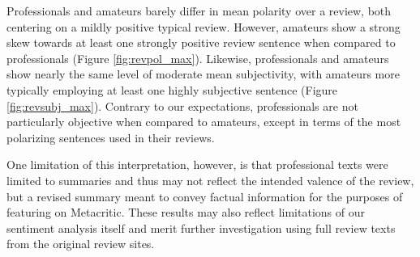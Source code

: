 \documentclass[letterpaper]{article}
\begin{document}
Professionals and amateurs barely differ in mean polarity over a review, both centering on a mildly positive typical review. However, amateurs show a strong skew towards at least one strongly positive review sentence when compared to professionals (Figure \ref{fig:revpol_max}). Likewise, professionals and amateurs show nearly the same level of moderate mean subjectivity, with amateurs more typically employing at least one highly subjective sentence (Figure \ref{fig:revsubj_max}). Contrary to our expectations, professionals are not particularly objective when compared to amateurs, except in terms of the most polarizing sentences used in their reviews.


One limitation of this interpretation, however, is that professional texts were limited to summaries and thus may not reflect the intended valence of the review, but a revised summary meant to convey factual information for the purposes of featuring on Metacritic. These results may also reflect limitations of our sentiment analysis itself and merit further investigation using full review texts from the original review sites.
\end{document}
